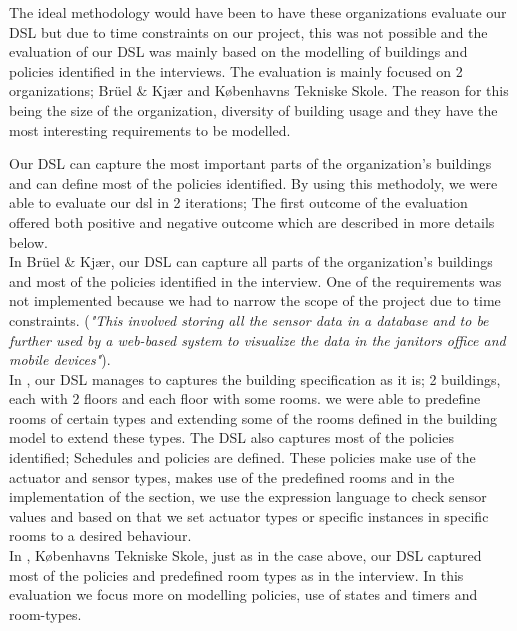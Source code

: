 The ideal methodology would have been to have these organizations evaluate our DSL but due to time constraints on our project, this was not possible and the evaluation of our DSL was mainly based on the modelling of buildings and policies identified in the interviews. The evaluation is mainly focused on 2 organizations; Br\"{u}el \& Kj\ae r and K\o benhavns Tekniske Skole. The reason for this being the size of the organization, diversity of building usage and they have the most interesting requirements to be modelled. 

Our DSL can capture the most important parts of the
organization's buildings and can define most of the policies identified. By using this methodoly, we were able to evaluate our dsl in 2 iterations; The first outcome of the evaluation offered both positive and negative outcome which are described in more details below.\\

In Br\"{u}el \& Kj\ae r, our DSL can capture all parts of the organization's buildings and most of the policies identified in the interview. One of the requirements was not implemented because we had to narrow the scope of the project due to time constraints. (\textit{"This involved storing all the sensor data in a database and to be further used by a web-based system to visualize the data in the janitors office and mobile devices"}).\\
In , our DSL manages to captures the building specification as it is; 2 buildings, each with 2 floors and each floor with some rooms. we were able to predefine rooms of certain types and extending some of the rooms defined in the building model to extend these types. The DSL also captures most of the policies identified; Schedules and policies are defined. These policies make use of the actuator and sensor types, makes use of the predefined rooms and in the implementation of the section, we use the expression language to check sensor values and based on that we set actuator types or specific instances in specific rooms to a desired behaviour. \\

In  , K\o benhavns Tekniske Skole, just as in the case above, our DSL captured most of the policies and predefined room types as in the interview. In this evaluation we focus more on modelling policies, use of states and timers and room-types.\\ 

